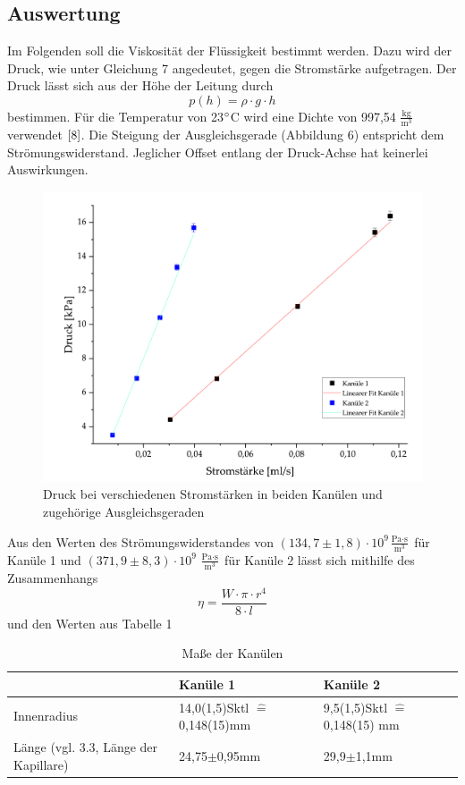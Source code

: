 \documentclass{article}
\begin{document}
\subsection{Auswertung}
Im Folgenden soll die Viskosität der Flüssigkeit bestimmt werden. Dazu wird der Druck, wie unter Gleichung 7 angedeutet, gegen die Stromstärke aufgetragen. Der Druck lässt sich aus der Höhe der Leitung durch
\begin{equation}
p(h) = \rho \cdot g \cdot h
\end{equation}
bestimmen. Für die Temperatur von 23$ \degree $C wird eine Dichte von 997,54 $\frac{\textrm{kg}}{\textrm{m}^3}$ verwendet $\cite{8}$. Die Steigung der Ausgleichsgerade (Abbildung 6) entspricht dem Strömungswiderstand. Jeglicher Offset entlang der Druck-Achse hat keinerlei Auswirkungen.
\begin{figure}[H]
\centering
\includegraphics[width=350pt]{DruckStrom-eps-converted-to.pdf}
\caption{Druck bei verschiedenen Stromstärken in beiden Kanülen und zugehörige Ausgleichsgeraden}
\label{fig:length_eight_mouse}
\end{figure}
\noindent
Aus den Werten des Strömungswiderstandes von $(134,7 \pm 1,8) \cdot 10^9 \frac{\textrm{Pa}\cdot \textrm{s}}{\textrm{m}^3}$ für Kanüle 1 und $(371,9 \pm 8,3)\cdot 10^9 \ \frac{\textrm{Pa}\cdot \textrm{s}}{\textrm{m}^3}$ für Kanüle 2 lässt sich mithilfe des Zusammenhangs
\begin{equation}
\eta = \frac{W\cdot\pi\cdot r^4}{8\cdot l}
\end{equation}
und den Werten aus Tabelle 1
\begin{table}[!ht]
\centering
\begin{tabular}{|l|l|l|}
\hline
            & Kanüle 1       & Kanüle 2       \\ \hline
Innenradius & 14,0(1,5)Sktl $\widehat{=}$ 0,148(15)mm& 9,5(1,5)Sktl $\widehat{=}$ 0,148(15) mm\\ \hline
Länge (vgl. 3.3, Länge der Kapillare)      & 24,75$\pm$0,95mm & 29,9$\pm$1,1mm \\ \hline
\end{tabular}
\caption{Maße der Kanülen}
\label{tab:my-table}
\end{table}
\end{document}
